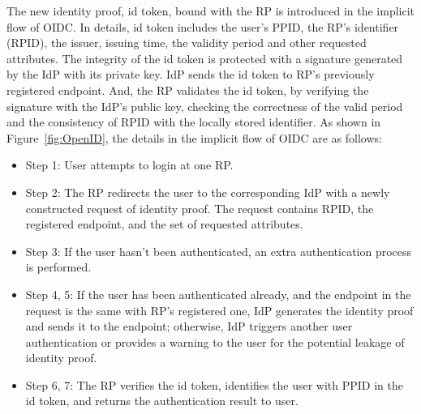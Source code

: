 The new identity proof, id token, bound with the RP is introduced in the implicit flow of OIDC.
In details, id token includes the user's PPID, the RP's identifier (RPID), the issuer, issuing time, the validity period and other requested attributes.
The integrity of the id token is protected with a signature generated by the IdP with its private key.
IdP
sends the id token to RP's previously registered endpoint.
And, the RP validates the id token, by verifying the signature with the IdP's public key, checking the correctness of the valid period and the consistency of RPID with the locally stored identifier. As shown in Figure~\ref{fig:OpenID}, the details in the implicit flow of OIDC are as follows:
\begin{itemize}
    \item Step 1: User attempts to login at one RP.
    \item Step 2: The RP redirects the user to the corresponding IdP with a newly constructed request of identity proof. The request contains RPID, the registered endpoint, and the set of requested attributes.
    \item Step 3: If the user hasn't been authenticated, an extra authentication process is performed.
    \item Step 4, 5: If the user has been authenticated already, and the endpoint in the request is the same with RP's registered one,
     IdP generates the identity proof and sends it to the endpoint; otherwise, IdP triggers another user authentication or provides a warning to the user for the potential leakage of identity proof.
    \item Step 6, 7: The RP verifies the id token, identifies the user with PPID in the id token, and returns the authentication result to user.
\end{itemize}

